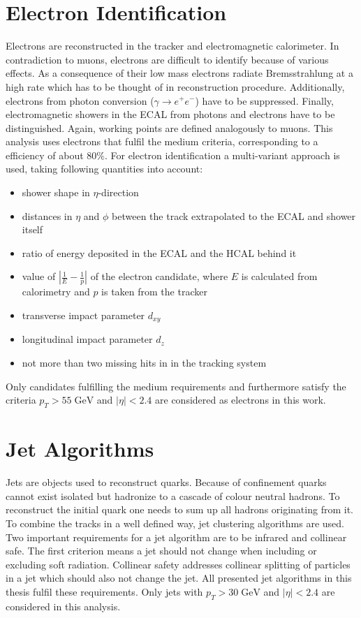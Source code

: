 \section{Electron Identification}
	Electrons are reconstructed in the tracker and electromagnetic calorimeter. In contradiction to muons, electrons are difficult to identify because of various effects. As a consequence of their low mass electrons radiate Bremsstrahlung at a high rate which has to be thought of in reconstruction procedure. Additionally, electrons from photon conversion ($\gamma \rightarrow e^+ e^-$) have to be suppressed. Finally, electromagnetic showers in the ECAL from photons and electrons have to be distinguished. Again, working points \cite{ElecID} are defined analogously to muons. This analysis uses electrons that fulfil the medium criteria, corresponding to a efficiency of about $80\%$. For electron identification a multi-variant approach is used, taking following quantities into account:
	\begin{itemize}
	\item shower shape in $\eta$-direction
	\item distances in $\eta$ and $\phi$ between the track extrapolated to the ECAL and shower itself
	\item ratio of energy deposited in the ECAL and the HCAL behind it
	\item value of $|\frac{1}{E} - \frac{1}{p}|$ of the electron candidate, where $E$ is calculated from calorimetry and $p$ is taken from the tracker
	\item transverse impact parameter $d_{xy}$
	\item longitudinal impact parameter $d_{z}$
	\item not more than two missing hits in in the tracking system
	\end{itemize}
	Only candidates fulfilling the medium requirements and furthermore satisfy the criteria $p_T > 55\;\text{GeV}$ and $|\eta| < 2.4$ are considered as electrons in this work.
\section{Jet Algorithms}
	Jets are objects used to reconstruct quarks. Because of confinement quarks cannot exist isolated but hadronize to a cascade of colour neutral hadrons. To reconstruct the initial quark one needs to sum up all hadrons originating from it. To combine the tracks in a well defined way, jet clustering algorithms are used. Two important requirements for a jet algorithm are to be infrared and collinear safe. The first criterion means a jet should not change when including or excluding soft radiation. Collinear safety addresses collinear splitting of particles in a jet which should also not change the jet. All presented jet algorithms in this thesis fulfil these requirements. Only jets with $p_T > 30\;\text{GeV}$ and $|\eta| < 2.4$ are considered in this analysis.
	
